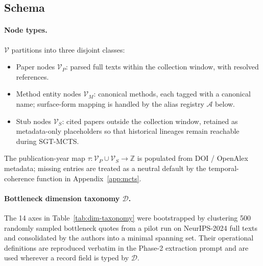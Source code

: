 \documentclass{llmxive}
\begin{document}
\subsection{Schema}

\paragraph{Node types.}
$\mathcal{V}$ partitions into three disjoint classes:
\begin{itemize}
\item Paper nodes $\mathcal{V}_P$: parsed full texts within the collection window, with resolved references.
\item Method entity nodes $\mathcal{V}_M$: canonical methods, each tagged with a canonical name; surface-form
mapping is handled by the alias registry $\mathcal{A}$ below.
\item Stub nodes $\mathcal{V}_S$: cited papers outside the collection window, retained as metadata-only placeholders
so that historical lineages remain reachable during SGT-MCTS.
\end{itemize}
The publication-year map $\tau:\mathcal{V}_P\cup\mathcal{V}_S\to\mathbb{Z}$ is populated from DOI / OpenAlex
metadata; missing entries are treated as a neutral default by the temporal-coherence function in Appendix~\ref{app:mcts}.

\paragraph{Bottleneck dimension taxonomy \texorpdfstring{$\mathcal{D}$}{D}.}
The 14 axes in Table~\ref{tab:dim-taxonomy} were bootstrapped by clustering 500 randomly sampled bottleneck quotes
from a pilot run on NeurIPS-2024 full texts and consolidated by the authors into a minimal spanning set. Their
operational definitions are reproduced verbatim in the Phase-2 extraction prompt and are used wherever a record
field is typed by $\mathcal{D}$.
\end{document}
